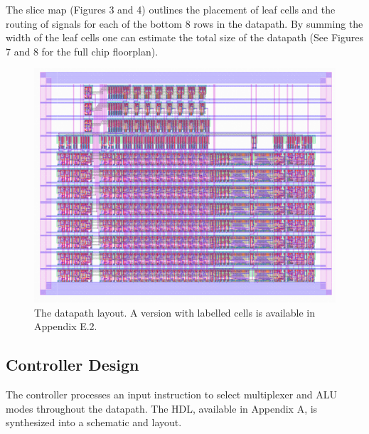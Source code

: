 \documentclass[12pt]{article}
\begin{document}
The slice map (Figures 3 and 4) outlines the placement of leaf cells and the routing of signals for each of the bottom 8 rows in the datapath.  By summing the width of the leaf cells one can estimate the total size of the datapath (See Figures 7 and 8 for the full chip floorplan).

%

\begin{figure}[H]
    \begin{center}
    \includegraphics[width=12cm]{HMMMDatapathFull.png}
    \end{center}
    \caption{The datapath layout. A version with labelled cells is available in Appendix E.2.}
    \label{fig:datapathlayout}
\end{figure}

\subsection{Controller Design}

The controller processes an input instruction to select multiplexer and ALU modes throughout the datapath. The HDL, available in Appendix A, is synthesized into a schematic and layout.
\end{document}

